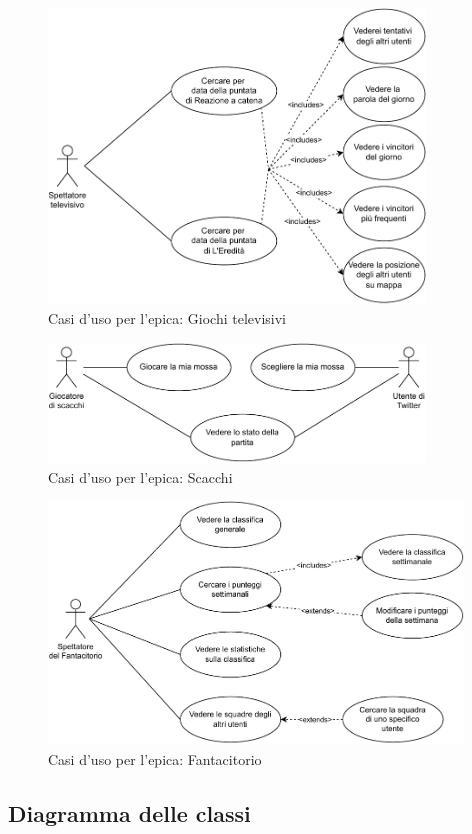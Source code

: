 \documentclass[11pt]{article}
\begin{document}
\begin{figure}[H]
    \centering
    \includegraphics[width=10cm]{./img/usecase/tvgames.pdf}
    \caption{Casi d'uso per l'epica: Giochi televisivi}
\end{figure}

\begin{figure}[H]
    \centering
    \includegraphics[width=10cm]{./img/usecase/chess.pdf}
    \caption{Casi d'uso per l'epica: Scacchi}
\end{figure}

\begin{figure}[H]
    \centering
    \includegraphics[width=11cm]{./img/usecase/fantacitorio.pdf}
    \caption{Casi d'uso per l'epica: Fantacitorio}
\end{figure}


\subsection{Diagramma delle classi}

\end{document}
